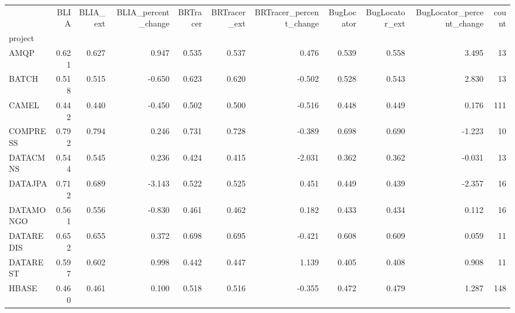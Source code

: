 \begin{tabular}{lrrrrrrrrrr}
\toprule
{} &  BLIA &  BLIA\_ext &  BLIA\_percent\_change &  BRTracer &  BRTracer\_ext &  BRTracer\_percent\_change &  BugLocator &  BugLocator\_ext &  BugLocator\_percent\_change &  count \\
project   &       &           &                      &           &               &                          &             &                 &                            &        \\
\midrule
AMQP      & 0.621 &     0.627 &                0.947 &     0.535 &         0.537 &                    0.476 &       0.539 &           0.558 &                      3.495 &     13 \\
BATCH     & 0.518 &     0.515 &               -0.650 &     0.623 &         0.620 &                   -0.502 &       0.528 &           0.543 &                      2.830 &     13 \\
CAMEL     & 0.442 &     0.440 &               -0.450 &     0.502 &         0.500 &                   -0.516 &       0.448 &           0.449 &                      0.176 &    111 \\
COMPRESS  & 0.792 &     0.794 &                0.246 &     0.731 &         0.728 &                   -0.389 &       0.698 &           0.690 &                     -1.223 &     10 \\
DATACMNS  & 0.544 &     0.545 &                0.236 &     0.424 &         0.415 &                   -2.031 &       0.362 &           0.362 &                     -0.031 &     13 \\
DATAJPA   & 0.712 &     0.689 &               -3.143 &     0.522 &         0.525 &                    0.451 &       0.449 &           0.439 &                     -2.357 &     16 \\
DATAMONGO & 0.561 &     0.556 &               -0.830 &     0.461 &         0.462 &                    0.182 &       0.433 &           0.434 &                      0.112 &     16 \\
DATAREDIS & 0.652 &     0.655 &                0.372 &     0.698 &         0.695 &                   -0.421 &       0.608 &           0.609 &                      0.059 &     11 \\
DATAREST  & 0.597 &     0.602 &                0.998 &     0.442 &         0.447 &                    1.139 &       0.405 &           0.408 &                      0.908 &     11 \\
HBASE     & 0.460 &     0.461 &                0.100 &     0.518 &         0.516 &                   -0.355 &       0.472 &           0.479 &                      1.287 &    148 \\

\end{tabular}

